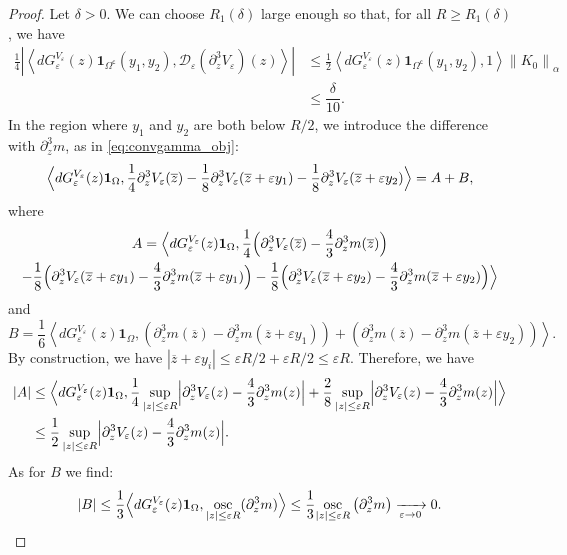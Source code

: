 \documentclass[JEP,XML,SOM,Unicode]{cedram}
\let\mathcal\mathscr
\theoremstyle{plain}
\theoremstyle{definition}
\newcommand{\comega}{\Omega^{\mathsf{c}}}
\newcommand{\D}{\mathcal{D}_\eps}
\let\eps\varepsilon
\newcommand{\abs}[1]{\left\lvert#1\right\rvert}
\newcommand{\Babs}[1]{\Bigl\lvert#1\Bigr\rvert}
\newcommand{\nalph}[1]{\left\lVert#1\right\rVert_\alpha}
\newcommand{\dQVe}{dG_\eps^{V_\eps}}
\newcommand{\bz}{\overline{z}}
\begin{document}
\begin{proof}
Let $\delta>0$. We can choose $R_1(\delta)$ large enough so that, for all $R\geq R_1(\delta)$, we have
\begin{equation*}
\begin{split}
\frac14 \left |\left\langle \dQVe(z)\mathbf{1}_{\comega}(y_1,y_2), \D(\partial_z^3 V_\eps)(z) \right\rangle \right |
&\leq \frac12 \left\langle \dQVe(z)\mathbf{1}_{\comega}(y_1,y_2), 1 \right\rangle \nalph{K_0}\\
& \leq \dfrac{\delta}{10}.
\end{split}
\end{equation*}
In the region where $y_1$ and $y_2$ are both below $R/2$,
we introduce the difference with $\partial_z^3m$, as in \eqref{eq:convgamma_obj}:
\begin{equation*}
\Bigl\langle \dQVe(z) \mathbf{1}_{\Omega}, \dfrac{1}{4} \partial_z^3 V_\eps(\bz) -\dfrac{1}{8} \partial^3_z V_\eps(\bz+\eps y_1)-\dfrac{1}{8} \partial^3_z V_\eps(\bz+\eps y_2) \Bigr\rangle = A + B,
\end{equation*}
where
\begin{multline*}
A = \Bigl\langle \dQVe(z)\mathbf{1}_{\Omega}, \dfrac{1}{4} \Bigl(\partial_z^3 V_\eps(\bz)-\frac43 \partial_z^3 m(\bz) \Bigr) \\
-\dfrac{1}{8} \Bigl(\partial^3_z V_\eps(\bz+\eps y_1)-\frac43 \partial_z^3 m(\bz + \eps y_1) \Bigr)-\dfrac{1}{8} \Bigl(\partial^3_z V_\eps(\bz+\eps y_2) -\frac43 \partial_z^3 m(\bz +\eps y_2) \Bigr) \Bigr\rangle
\end{multline*}
and
\begin{equation*}
B = \frac16 \left\langle \dQVe(z)\mathbf{1}_{\Omega}, \left (\partial^3_z m(\bz) - \partial_z^3 m(\bz + \eps y_1)\right) +\left (\partial^3_z m(\bz) - \partial_z^3 m(\bz +\eps y_2) \right)\right\rangle.
\end{equation*}
By construction, we have $|\bz + \eps y_i| \leq \eps R/2 + \eps R/2 \leq \eps R$. Therefore, we have
\begin{align*}
\abs{A} & \leq \Bigl\langle \dQVe(z) \mathbf{1}_{\Omega}, \dfrac{1}{4} \sup_{\abs{z} \leq \eps R}\Babs{ \partial_z^3 V_\eps(z)- \frac43 \partial_z^3 m(z)} + \dfrac{2}{8} \sup_{\abs{z} \leq \eps R} \Babs{ \partial_z^3 V_\eps(z)- \frac43 \partial_z^3 m(z)} \Bigr\rangle \\
& \leq \dfrac{1}{2}\sup_{\abs{z} \leq \eps R} \Babs{ \partial_z^3 V_\eps(z)- \frac43 \partial_z^3 m(z)}.
\end{align*}
As for $B$ we find:
\begin{equation*}
\abs{B} \leq \dfrac13 \Bigl\langle \dQVe(z) \mathbf{1}_{\Omega}, \underset{\abs{z} \leq \eps R} { \text{ osc }}(\partial_z^3 m) \Bigr\rangle \leq \dfrac13 \underset{\abs{z} \leq \eps R} { \text{ osc }}\left (\partial_z^3 m\right) \xrightarrow[\eps \to 0]{} 0.

\end{equation*}
\end{proof}
\end{document}
